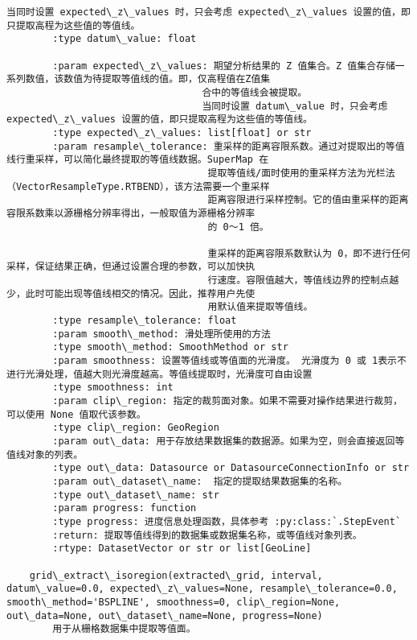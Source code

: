 \documentclass[11pt]{article}
\begin{document}
\begin{Verbatim}[commandchars=\\\{\}]
                            当同时设置 expected\_z\_values 时，只会考虑 expected\_z\_values 设置的值，即只提取高程为这些值的等值线。
        :type datum\_value: float
        
        :param expected\_z\_values: 期望分析结果的 Z 值集合。Z 值集合存储一系列数值，该数值为待提取等值线的值。即，仅高程值在Z值集
                                  合中的等值线会被提取。
                                  当同时设置 datum\_value 时，只会考虑 expected\_z\_values 设置的值，即只提取高程为这些值的等值线。
        :type expected\_z\_values: list[float] or str
        :param resample\_tolerance: 重采样的距离容限系数。通过对提取出的等值线行重采样，可以简化最终提取的等值线数据。SuperMap 在
                                   提取等值线/面时使用的重采样方法为光栏法（VectorResampleType.RTBEND），该方法需要一个重采样
                                   距离容限进行采样控制。它的值由重采样的距离容限系数乘以源栅格分辨率得出，一般取值为源栅格分辨率
                                   的 0～1 倍。
        
                                   重采样的距离容限系数默认为 0，即不进行任何采样，保证结果正确，但通过设置合理的参数，可以加快执
                                   行速度。容限值越大，等值线边界的控制点越少，此时可能出现等值线相交的情况。因此，推荐用户先使
                                   用默认值来提取等值线。
        :type resample\_tolerance: float
        :param smooth\_method: 滑处理所使用的方法
        :type smooth\_method: SmoothMethod or str
        :param smoothness: 设置等值线或等值面的光滑度。 光滑度为 0 或 1表示不进行光滑处理，值越大则光滑度越高。等值线提取时，光滑度可自由设置
        :type smoothness: int
        :param clip\_region: 指定的裁剪面对象。如果不需要对操作结果进行裁剪，可以使用 None 值取代该参数。
        :type clip\_region: GeoRegion
        :param out\_data: 用于存放结果数据集的数据源。如果为空，则会直接返回等值线对象的列表。
        :type out\_data: Datasource or DatasourceConnectionInfo or str
        :param out\_dataset\_name:  指定的提取结果数据集的名称。
        :type out\_dataset\_name: str
        :param progress: function
        :type progress: 进度信息处理函数，具体参考 :py:class:`.StepEvent`
        :return: 提取等值线得到的数据集或数据集名称，或等值线对象列表。
        :rtype: DatasetVector or str or list[GeoLine]
    
    grid\_extract\_isoregion(extracted\_grid, interval, datum\_value=0.0, expected\_z\_values=None, resample\_tolerance=0.0, smooth\_method='BSPLINE', smoothness=0, clip\_region=None, out\_data=None, out\_dataset\_name=None, progress=None)
        用于从栅格数据集中提取等值面。
        

\end{Verbatim}
\end{document}
